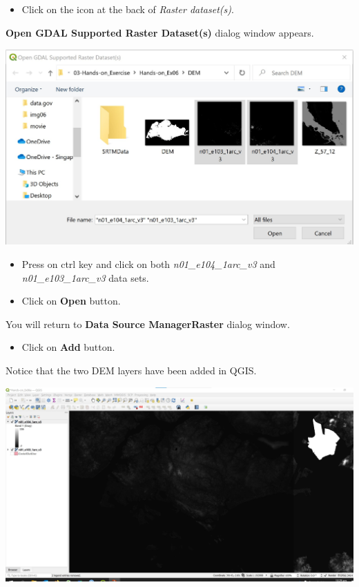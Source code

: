 \documentclass[
  letterpaper,
  DIV=11,
  numbers=noendperiod]{scrreprt}
\providecommand{\tightlist}{%
  \setlength{\itemsep}{0pt}\setlength{\parskip}{0pt}}\usepackage{longtable,booktabs,array}
\begin{document}
\begin{itemize}
\tightlist
\item
  Click on the icon at the back of \emph{Raster dataset(s)}.
\end{itemize}

\textbf{Open GDAL Supported Raster Dataset(s)} dialog window appears.

\includegraphics{./img06/image35.jpg}

\begin{itemize}
\item
  Press on ctrl key and click on both \emph{n01\_e104\_1arc\_v3} and
  \emph{n01\_e103\_1arc\_v3} data sets.
\item
  Click on \textbf{Open} button.
\end{itemize}

You will return to \textbf{Data Source Manager\textbar Raster} dialog
window.

\begin{itemize}
\tightlist
\item
  Click on \textbf{Add} button.
\end{itemize}

Notice that the two DEM layers have been added in QGIS.

\includegraphics{./img06/image36.jpg}
\end{document}
